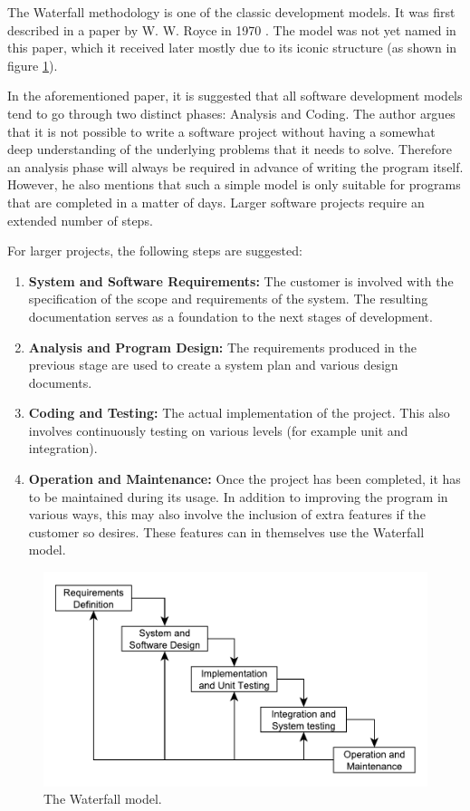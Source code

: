 The Waterfall methodology is one of the classic development models. It was first described in a paper by W. W. Royce in 1970 \cite{waterfall}.  The model was not yet named in this paper, which it received later mostly due to its iconic structure (as shown in figure \ref{waterfall}).

In the aforementioned paper, it is suggested that all software development models tend to go through two distinct phases: Analysis and Coding. The author argues that it is not possible to write a software project without having a somewhat deep understanding of the underlying problems that it needs to solve. Therefore an analysis phase will always be required in advance of writing the program itself. However, he also mentions that such a simple model is only suitable for programs that are completed in a matter of days. Larger software projects require an extended number of steps.

For larger projects, the following steps are suggested:
\begin{enumerate}
	\item \textbf{System and Software Requirements:} The customer is involved with the specification of the scope and requirements of the system. The resulting documentation serves as a foundation to the next stages of development.
	\item \textbf{Analysis and Program Design:} The requirements produced in the previous stage are used to create a system plan and various design documents.
	\item \textbf{Coding and Testing:} The actual implementation of the project. This also involves continuously testing on various levels (for example unit and integration).
	\item \textbf{Operation and Maintenance:} Once the project has been completed, it has to be maintained during its usage. In addition to improving the program in various ways, this may also involve the inclusion of extra features if the customer so desires. These features can in themselves use the Waterfall model.
\end{enumerate}

\begin{figure}[H]
\centering
\includegraphics[width=150mm]{images/chapters/development_models/waterfall.pdf}
\caption{The Waterfall model.}
\label{waterfall}
\end{figure}

